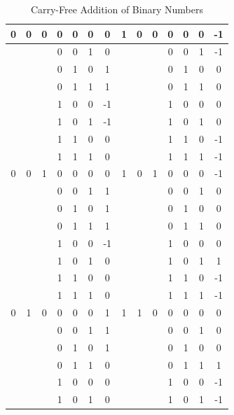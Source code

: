 \documentclass[conference]{IEEEtran_NCC}
\begin{document}
\vspace{-.5em}
\setlength{\tabcolsep}{0.5em}
\begin{table}[h!]
  \centering
  \caption{Carry-Free Addition of Binary Numbers}
  \label{tab:table5}
  \begin{tabular}{|c|c|c|c|c|c||c|||c|c|c|c|c|c||c|}
    \hline
    0 & 0 & 0 & 0 & 0 & 0 & 0  &  1 & 0 & 0 & 0 & 0 & 0 & -1 \\
    \hline
    & & & 0 & 0 & 1 & 0  &  & & & 0 & 0 & 1 & -1 \\
    \hline
    & & & 0 & 1 & 0 & 1  &  & & & 0 & 1 & 0 & 0 \\
    \hline
    & & & 0 & 1 & 1 & 1  &  & & & 0 & 1 & 1 & 0 \\
    \hline
    & & & 1 & 0 & 0 & -1  &  & & & 1 & 0 & 0 & 0 \\
    \hline
    & & & 1 & 0 & 1 & -1  &  & & & 1 & 0 & 1 & 0 \\
    \hline
    & & & 1 & 1 & 0 & 0  &  & & & 1 & 1 & 0 & -1 \\
    \hline
    & & & 1 & 1 & 1 & 0  &  & & & 1 & 1 & 1 & -1 \\
    \hline
    0 & 0 & 1 & 0 & 0 & 0 & 0  &  1 & 0 & 1 & 0 & 0 & 0 & -1 \\
    \hline
    & & & 0 & 0 & 1 & 1  &  & & & 0 & 0 & 1 & 0 \\
    \hline
    & & & 0 & 1 & 0 & 1  &  & & & 0 & 1 & 0 & 0 \\
    \hline
    & & & 0 & 1 & 1 & 1  &  & & & 0 & 1 & 1 & 0 \\
    \hline
    & & & 1 & 0 & 0 & -1  &  & & & 1 & 0 & 0 & 0 \\
    \hline
    & & & 1 & 0 & 1 & 0  &  & & & 1 & 0 & 1 & 1 \\
    \hline
    & & & 1 & 1 & 0 & 0  &  & & & 1 & 1 & 0 & -1 \\
    \hline
    & & & 1 & 1 & 1 & 0  &  & & & 1 & 1 & 1 & -1 \\
    \hline
    0 & 1 & 0 & 0 & 0 & 0 & 1  &  1 & 1 & 0 & 0 & 0 & 0 & 0 \\
    \hline
    & & & 0 & 0 & 1 & 1  &  & & & 0 & 0 & 1 & 0 \\
    \hline
    & & & 0 & 1 & 0 & 1  &  & & & 0 & 1 & 0 & 0 \\
    \hline
    & & & 0 & 1 & 1 & 0  &  & & & 0 & 1 & 1 & 1 \\
    \hline
    & & & 1 & 0 & 0 & 0  &  & & & 1 & 0 & 0 & -1 \\
    \hline
    & & & 1 & 0 & 1 & 0  &  & & & 1 & 0 & 1 & -1 \\

\end{tabular}
\end{table}
\end{document}
